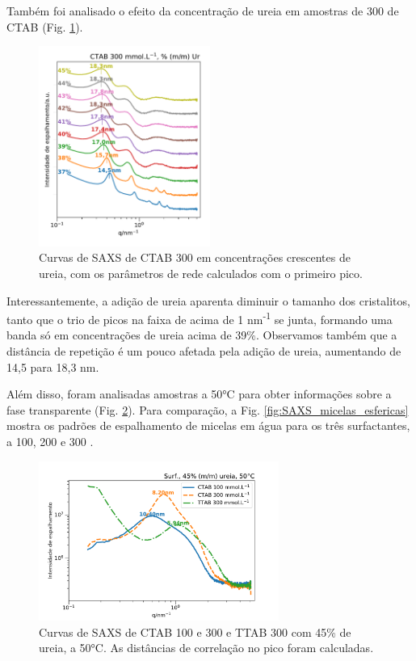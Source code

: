 	
	Também foi analisado o efeito da concentração de ureia em amostras de 300 \mM{} de CTAB (Fig. \ref{fig:SAXS_ctab300ur37-45}).
	
	\begin{figure}[H]
		\centering
		\includegraphics[width=0.5\textwidth]{imagens/saxs/CTAB300Ur37-45}
		\caption{Curvas de SAXS de CTAB 300 \mM{} em concentrações crescentes de ureia, com os parâmetros de rede calculados com o primeiro pico.}
		\label{fig:SAXS_ctab300ur37-45}
	\end{figure}
	
	Interessantemente, a adição de ureia aparenta diminuir o tamanho dos cristalitos, tanto que o trio de picos na faixa de \q{} acima de 1 nm\textsuperscript{-1} se junta, formando uma banda só em concentrações de ureia acima de 39\%. Observamos também que a distância de repetição é um pouco afetada pela adição de ureia, aumentando de 14,5 para 18,3 nm.
	
	Além disso, foram analisadas amostras a 50°C para obter informações sobre a fase transparente (Fig. \ref{fig:SAXS_surf50c}). Para comparação, a Fig. \ref{fig:SAXS_micelas_esfericas} mostra os padrões de espalhamento de micelas em água para os três surfactantes, a 100, 200 e 300 \mM.
	
	\begin{figure}[H]
		\centering
		\includegraphics[width=0.7\textwidth]{imagens/saxs/Surf_50C}
		\caption{Curvas de SAXS de CTAB 100 e 300 \mM{} e TTAB 300 \mM{} com 45\% de ureia, a 50°C. As distâncias de correlação no pico foram calculadas.}
		\label{fig:SAXS_surf50c}
	\end{figure}

